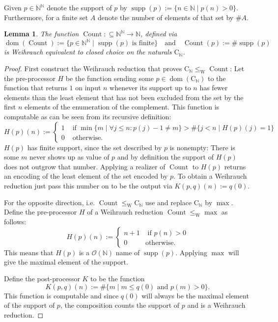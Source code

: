 \documentclass{eptcs-modified}
\newtheorem{lemma}[theorem]{Lemma}
\newcommand{\dom}{\operatorname{dom}}
\newcommand{\Baire}{{\mathbb{N}^\mathbb{N}}}
\newcommand{\leqW}{\leq_{\textrm{W}}}
\newcommand{\CCN}{\mathrm{C}_{\NN}}
\newcommand{\NN}{\mathbb{N}}
\newcommand{\OO}{\mathcal{O}}
\newcommand{\Count}{\operatorname{Count}}
\newcommand{\supp}{\operatorname{supp}}
\newcommand{\card}[1]{\#{#1}}
\begin{document}
			Given $p\in\Baire$ denote the support of $p$ by $\supp(p) := \{n\in\NN\mid p(n)>0\}$.
			Furthermore, for a finite set $A$ denote the number of elements of that set by $\card A$.
			\begin{lemma}\label{lemma:count}
				The function $\operatorname{Count}:\subseteq \Baire \to \mathbb{N}$, defined via
				\[ \dom(\operatorname{Count}) := \{p \in \Baire \mid \supp(p) \text{ is finite}\} \quad\text{and}\quad \operatorname{Count}(p) := \card{\supp(p)} \]
				is Weihrauch equivalent to closed choice on the naturals $\CCN$.
			\end{lemma}

			\begin{proof}
				First construct the Weihrauch reduction that proves $\CCN\leqW\operatorname{Count}$:
				Let the pre-processor $H$ be the function sending some $p\in \dom(\CCN)$ to the function that returns $1$ on input $n$ whenever its support up to $n$ has fewer elements than the least element that has not been excluded from the set by the first $n$ elements of the enumeration of the complement.
				This function is computable as can be seen from its recursive definition:
				\[ H(p)(n) := \begin{cases} 1 & \text{ if }\min\{m\mid\forall j\leq n: p(j)-1\neq m\} > \card{\{j < n \mid H(p)(j) = 1\}} \\ 0 & \text{ otherwise.}\end{cases} \]
				$H(p)$ has finite support, since the set described by $p$ is nonempty:
				There is some $m$ never shows up as value of $p$ and by definition the support of $H(p)$ does not outgrow that number.
				Applying a realizer of $\operatorname{Count}$ to $H(p)$ returns an encoding of the least element of the set encoded by $p$.
				To obtain a Weihrauch reduction just pass this number on to be the output via $K(p,q)(n) := q(0)$.
				
				For the opposite direction, i.e. $\Count\leqW\CCN$ use  and replace $\CCN$ by $\max$.
				Define the pre-processor $H$ of a Weihrauch reduction $\Count\leqW\max$ as follows:
				\[ H(p)(n) := \begin{cases} n+1 & \text{ if }p(n) > 0 \\ 0 & \text{otherwise.} \end{cases} \]
				This means that $H(p)$ is a $\OO(\NN)$ name of $\supp(p)$.
				Applying $\max$ will give the maximal element of the support.

				Define the post-processor $K$ to be the function
				\[ K(p,q)(n) := \card{\{m\mid m \leq q(0)\text{ and } p(m)>0\}}. \]
				This function is computable and since $q(0)$ will always be the maximal element of the support of $p$, the composition counts the support of $p$ and is a Weihrauch reduction.
			\end{proof}
\end{document}
